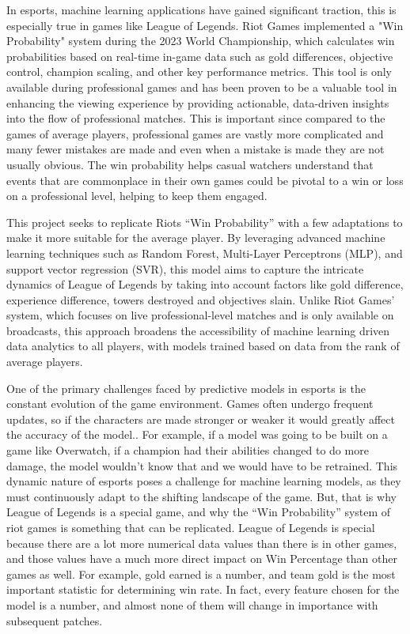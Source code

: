 \documentclass[10pt,twocolumn]{article}
\begin{document}
In esports, machine learning applications have gained significant traction, this is especially true in games like League of Legends. Riot Games implemented a "Win Probability" system during the 2023 World Championship, which calculates win probabilities based on real-time in-game data such as gold differences, objective control, champion scaling, and other key performance metrics. This tool is only available during professional games and has been proven to be a valuable tool in enhancing the viewing experience by providing actionable, data-driven insights into the flow of professional matches. This is important since compared to the games of average players, professional games are vastly more complicated and many fewer mistakes are made and even when a mistake is made they are not usually obvious. The win probability helps casual watchers understand that events that are commonplace in their own games could be pivotal to a win or loss on a professional level, helping to keep them engaged.

This project seeks to replicate Riots “Win Probability” with a few adaptations to make it more suitable for the average player. By leveraging advanced machine learning techniques such as Random Forest, Multi-Layer Perceptrons (MLP), and support vector regression (SVR), this model aims to capture the intricate dynamics of League of Legends by taking into account factors like gold difference, experience difference, towers destroyed and objectives slain. Unlike Riot Games' system, which focuses on live professional-level matches and is only available on broadcasts, this approach broadens the accessibility of machine learning driven data analytics to all players, with models trained based on data from the rank of average players.

One of the primary challenges faced by predictive models in esports is the constant evolution of the game environment. Games often undergo frequent updates, so if the characters are made stronger or weaker it would greatly affect the accuracy of the model.. For example, if a model was going to be built on a game like Overwatch, if a champion had their abilities changed to do more damage, the model wouldn’t know that and we would have to be retrained. This dynamic nature of esports poses a challenge for machine learning models, as they must continuously adapt to the shifting landscape of the game. But, that is why League of Legends is a special game, and why the “Win Probability” system of riot games is something that can be replicated. League of Legends is special because there are a lot more numerical data values than there is in other games, and those values have a much more direct impact on Win Percentage than other games as well. For example, gold earned is a number, and team gold is the most important statistic for determining win rate. In fact, every feature chosen for the model is a number, and almost none of them will change in importance with subsequent patches.
\end{document}
